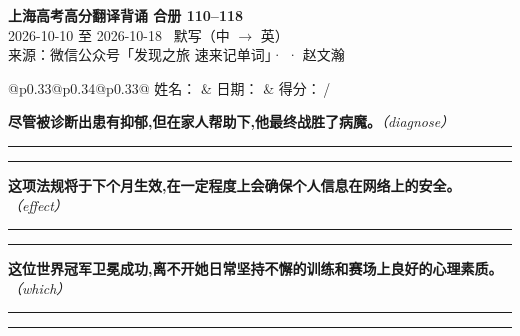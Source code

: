 \documentclass[11pt,a4paper]{article}
\newcommand{\num}[1]{\makebox[1.9em][r]{#1.}\hspace{0.3em}}
\newcommand{\wline}{\noindent\rule{\linewidth}{0.4pt}}
\newcommand{\prompt}[1]{\emph{\textcolor{tipblue}{\small（#1）}}}
\begin{document}
\pagestyle{plain}
\begin{center}
{\LARGE\bfseries 上海高考高分翻译背诵 \quad 合册 110–118}\\[0.25em]
{\large 2026-10-10 至 2026-10-18 \quad\ 默写（中 $\to$ 英）}\\[0.35em]
{\footnotesize 来源：微信公众号「发现之旅 速来记单词」·  · 赵文瀚}
\end{center}

\vspace{0.4em}
\noindent\begin{tabular}{@{}p{0.33\textwidth}@{}p{0.34\textwidth}@{}p{0.33\textwidth}@{}}
姓名：\underline{\hspace{2.0cm}} & 日期：\underline{\hspace{2.0cm}} & 得分：\underline{\hspace{1.4cm}}\,/ \\
\end{tabular}

\vspace{0.5em}

\vspace{0.8em}
\vspace{0.35em}\vspace{0.15em}

\begin{minipage}{\linewidth}

\num{1}\textbf{尽管被诊断出患有抑郁,但在家人帮助下,他最终战胜了病魔。}\prompt{diagnose}

\vspace{0.3em}

\wline\vspace{0.3em}
\wline

\end{minipage}

\begin{minipage}{\linewidth}

\num{2}\textbf{这项法规将于下个月生效,在一定程度上会确保个人信息在网络上的安全。}\prompt{effect}

\vspace{0.3em}

\wline\vspace{0.3em}
\wline

\end{minipage}

\begin{minipage}{\linewidth}

\num{3}\textbf{这位世界冠军卫冕成功,离不开她日常坚持不懈的训练和赛场上良好的心理素质。}\prompt{which}

\vspace{0.3em}

\wline\vspace{0.3em}
\wline

\end{minipage}
\end{document}
